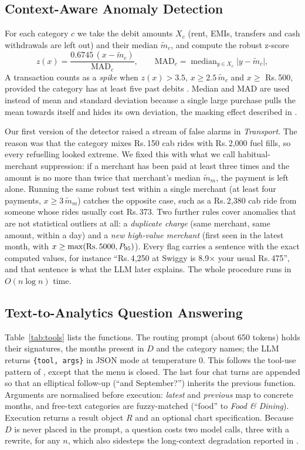 \documentclass[conference]{IEEEtran}
\DeclareRobustCommand{\rupee}{Rs.\,}
\begin{document}
\subsection{Context-Aware Anomaly Detection}
For each category $c$ we take the debit amounts $X_c$ (rent, EMIs, transfers and cash withdrawals are left out) and their median $\tilde{m}_c$, and compute the robust z-score
\begin{equation}
z(x)=\frac{0.6745\,(x-\tilde{m}_c)}{\mathrm{MAD}_c},\qquad \mathrm{MAD}_c=\operatorname{median}_{y\in X_c}\lvert y-\tilde{m}_c\rvert ,
\end{equation}
A transaction counts as a \emph{spike} when $z(x)>3.5$, $x\ge 2.5\,\tilde{m}_c$ and $x\ge$ \rupee 500, provided the category has at least five past debits \cite{iglewicz1993}. Median and MAD are used instead of mean and standard deviation because a single large purchase pulls the mean towards itself and hides its own deviation, the masking effect described in \cite{chandola2009anomaly}.

Our first version of the detector raised a stream of false alarms in \emph{Transport}. The reason was that the category mixes \rupee 150 cab rides with \rupee 2,000 fuel fills, so every refuelling looked extreme. We fixed this with what we call habitual-merchant suppression: if a merchant has been paid at least three times and the amount is no more than twice that merchant's median $\tilde{m}_m$, the payment is left alone. Running the same robust test within a single merchant (at least four payments, $x\ge 3\,\tilde{m}_m$) catches the opposite case, such as a \rupee 2,380 cab ride from someone whose rides usually cost \rupee 373. Two further rules cover anomalies that are not statistical outliers at all: a \emph{duplicate charge} (same merchant, same amount, within a day) and a \emph{new high-value merchant} (first seen in the latest month, with $x\ge\max(\text{\rupee}5000, P_{95})$). Every flag carries a sentence with the exact computed values, for instance ``\rupee 4,250 at Swiggy is 8.9$\times$ your usual \rupee 475'', and that sentence is what the LLM later explains. The whole procedure runs in $O(n\log n)$ time.

\subsection{Text-to-Analytics Question Answering}
Table~\ref{tab:tools} lists the functions. The routing prompt (about 650 tokens) holds their signatures, the months present in $D$ and the category names; the LLM returns \texttt{\{tool, args\}} in JSON mode at temperature 0. This follows the tool-use pattern of \cite{yao2023react,schick2023toolformer}, except that the menu is closed. The last four chat turns are appended so that an elliptical follow-up (``and September?'') inherits the previous function. Arguments are normalised before execution: \emph{latest} and \emph{previous} map to concrete months, and free-text categories are fuzzy-matched (``food'' to \emph{Food \& Dining}). Execution returns a result object $R$ and an optional chart specification. Because $D$ is never placed in the prompt, a question costs two model calls, three with a rewrite, for any $n$, which also sidesteps the long-context degradation reported in \cite{liu2024lost}.
\end{document}
